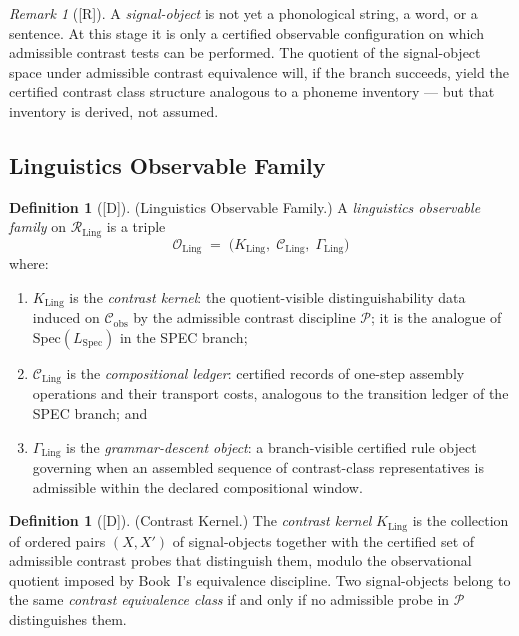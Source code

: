 \documentclass[12pt,oneside]{amsbook}
\theoremstyle{plain}
\theoremstyle{definition}
\newtheorem{definition}[theorem]{Definition}
\theoremstyle{remark}
\newtheorem{remark}[theorem]{Remark}
\newcommand{\status}[1]{\textup{[#1]}}
\begin{document}
\begin{remark}[\status{R}]\label{rem:ling-signal-object}
A \emph{signal-object} is not yet a phonological string, a word, or a
sentence. At this stage it is only a certified observable configuration
on which admissible contrast tests can be performed. The quotient of
the signal-object space under admissible contrast equivalence will, if
the branch succeeds, yield the certified contrast class structure
analogous to a phoneme inventory --- but that inventory is derived, not
assumed.
\end{remark}

\subsection{Linguistics Observable Family}\label{sec:ling-obs-family}

\begin{definition}[\status{D}]\label{def:ling-obs-family}
\textup{(Linguistics Observable Family.)}
A \emph{linguistics observable family} on $\mathcal{R}_{\mathrm{Ling}}$
is a triple
\[
 \mathcal{O}_{\mathrm{Ling}} \;=\;
 \bigl(K_{\mathrm{Ling}},\;
 \mathcal{C}_{\mathrm{Ling}},\;
 \Gamma_{\mathrm{Ling}}\bigr)
\]
where:
\begin{enumerate}[label=\textup{(\arabic*)}]
 \item $K_{\mathrm{Ling}}$ is the \emph{contrast kernel}: the
 quotient-visible distinguishability data induced on
 $\mathcal{C}_{\mathrm{obs}}$ by the admissible contrast discipline
 $\mathcal{P}$; it is the analogue of $\mathrm{Spec}(L_{\mathrm{Spec}})$
 in the SPEC branch;
 \item $\mathcal{C}_{\mathrm{Ling}}$ is the \emph{compositional ledger}:
 certified records of one-step assembly operations and their
 transport costs, analogous to the transition ledger of the SPEC
 branch; and
 \item $\Gamma_{\mathrm{Ling}}$ is the \emph{grammar-descent object}:
 a branch-visible certified rule object governing when an assembled
 sequence of contrast-class representatives is admissible within the
 declared compositional window.
\end{enumerate}
\end{definition}

\begin{definition}[\status{D}]\label{def:ling-contrast-kernel}
\textup{(Contrast Kernel.)}
The \emph{contrast kernel} $K_{\mathrm{Ling}}$ is the collection of
ordered pairs $(X, X')$ of signal-objects together with the certified
set of admissible contrast probes that distinguish them, modulo the
observational quotient imposed by Book~I's equivalence discipline.
Two signal-objects belong to the same \emph{contrast equivalence class}
if and only if no admissible probe in $\mathcal{P}$ distinguishes them.
\end{definition}
\end{document}
